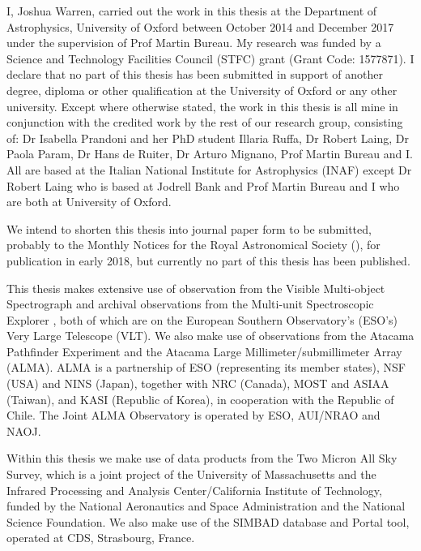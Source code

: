 \begin{originalitylong}
I, Joshua Warren, carried out the work in this thesis at the Department of Astrophysics, University of Oxford between October 2014 and December 2017 under the supervision of Prof Martin Bureau. My research was funded by a Science and Technology Facilities Council (STFC) grant (Grant Code: 1577871). I declare that no part of this thesis has been submitted in support of another degree, diploma or other qualification at the University of Oxford or any other university. Except where otherwise stated, the work in this thesis is all mine in conjunction with the credited work by the rest of our research group, consisting of: Dr Isabella Prandoni and her PhD student Illaria Ruffa, Dr Robert Laing, Dr Paola Param, Dr Hans de Ruiter, Dr Arturo Mignano, Prof Martin Bureau and I. All are based at the Italian National Institute for Astrophysics (INAF) except Dr Robert Laing who is based at Jodrell Bank and Prof Martin Bureau and I who are both at University of Oxford.

We intend to shorten this thesis into journal paper form to be submitted, probably to the Monthly Notices for the Royal Astronomical Society (\mnras), for publication in early 2018, but currently no part of this thesis has been published. 

This thesis makes extensive use of observation from the Visible Multi-object Spectrograph \citep[VIMOS; ][]{LeFevre2003} and archival observations from the Multi-unit Spectroscopic Explorer \citep[MUSE; ][]{Bacon2010}, both of which are on the European Southern Observatory's (ESO's) Very Large Telescope (VLT). We also make use of observations from the Atacama Pathfinder Experiment \citep[APEX; ][]{Gusten2006} and the Atacama Large Millimeter/submillimeter Array (ALMA). ALMA is a partnership of ESO (representing its member states), NSF (USA) and NINS (Japan), together with NRC (Canada), MOST and ASIAA (Taiwan), and KASI (Republic of Korea), in cooperation with the Republic of Chile. The Joint ALMA Observatory is operated by ESO, AUI/NRAO and NAOJ.

Within this thesis we make use of data products from the Two Micron All Sky Survey, which is a joint project of the University of Massachusetts and the Infrared Processing and Analysis Center/California Institute of Technology, funded by the National Aeronautics and Space Administration and the National Science Foundation. We also make use of the SIMBAD database and Portal tool, operated at CDS, Strasbourg, France. 


\end{originalitylong}
